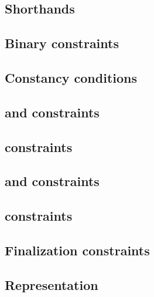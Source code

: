 \subsection{Shorthands}                                      \label{block data: generalities: shorthands}                            
\subsection{Binary constraints}                              \label{block data: generalities: binarities}                            
\subsection{Constancy                 conditions}            \label{block data: generalities: constancies}                           
\subsection{\locFlagSum{} and \iomf{} constraints}           \label{block data: generalities: iomf constraints}                      
\subsection{\relBlock{}               constraints}           \label{block data: generalities: rel block constraints}                 
\subsection{\ct{} and \maxCt{}        constraints}           \label{block data: generalities: ct and ct max constraints}             
\subsection{\instruction{}            constraints}           \label{block data: generalities: instruction constraints}               
\subsection{Finalization              constraints}           \label{block data: generalities: finalization}                          
\subsection{Representation}                                  \label{block data: generalities: representation}                        

